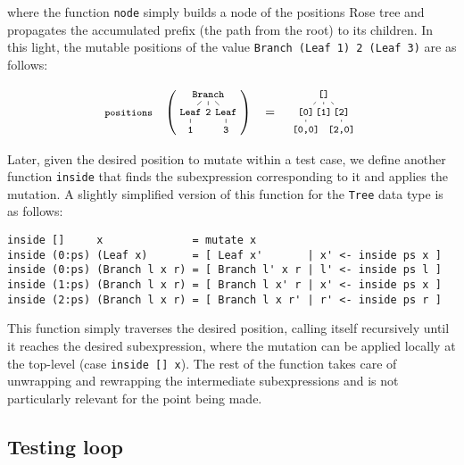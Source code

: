 \documentclass[sigconf, anonymous, review]{acmart}
\begin{document}
\noindent where the function \texttt{node} simply builds a node of the positions
Rose tree and propagates the accumulated prefix (the path from the root) to its
children.
%
In this light, the mutable positions of the value \texttt{Branch (Leaf 1) 2
  (Leaf 3)} are as follows:

\begin{equation}
  \nonumber
  \footnotesize
  \texttt{positions}\quad
  \left(
  \tikz[
    baseline=-6mm,
    level distance=0.5cm,
    level 1/.style={sibling distance=0.5cm},
    level 2/.style={sibling distance=0.5cm}
  ]{
    \node {\texttt{Branch}}
      child {node {\texttt{Leaf}}
        child {node {\texttt{1}}}
      }
      child {node {\texttt{2}}}
      child {node {\texttt{Leaf}}
        child {node {\texttt{3}}}
      };
  }
  \right)
  \quad
  =
  \quad
  \tikz[
    baseline=-6mm,
    level distance=0.5cm,
    level 1/.style={sibling distance=0.5cm},
    level 2/.style={sibling distance=0.5cm}
  ]{
    \node {\texttt{[]}}
      child {node {\texttt{[0]}}
        child {node {\texttt{[0,0]}}}
      }
      child {node {\texttt{[1]}}}
      child {node {\texttt{[2]}}
        child {node {\texttt{[2,0]}}}
      };
  }
\end{equation}

\noindent Later, given the desired position to mutate within a test case, we
define another function \texttt{inside} that finds the subexpression
corresponding to it and applies the mutation.
%
A slightly simplified version of this function for the \texttt{Tree} data type is
as follows:

\begin{verbatim}
inside []     x              = mutate x
inside (0:ps) (Leaf x)       = [ Leaf x'       | x' <- inside ps x ]
inside (0:ps) (Branch l x r) = [ Branch l' x r | l' <- inside ps l ]
inside (1:ps) (Branch l x r) = [ Branch l x' r | x' <- inside ps x ]
inside (2:ps) (Branch l x r) = [ Branch l x r' | r' <- inside ps r ]
\end{verbatim}

\noindent This function simply traverses the desired position, calling itself
recursively until it reaches the desired subexpression, where the mutation can
be applied locally at the top-level (case \texttt{inside [] x}).
%
The rest of the function takes care of unwrapping and rewrapping the
intermediate subexpressions and is not particularly relevant for the point being
made.


\subsection{Testing loop}
\end{document}
